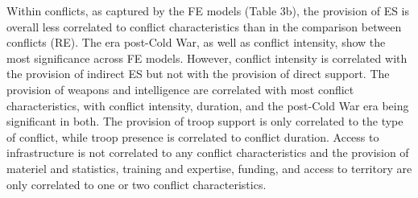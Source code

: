 \documentclass[
]{article}
\begin{document}
\begin{landscape}
\begin{table}[!h]
\centering
{}
\end{table}
\end{landscape}

Within conflicts, as captured by the FE models (Table 3b), the provision
of ES is overall less correlated to conflict characteristics than in the
comparison between conflicts (RE). The era post-Cold War, as well as
conflict intensity, show the most significance across FE models.
However, conflict intensity is correlated with the provision of indirect
ES but not with the provision of direct support. The provision of
weapons and intelligence are correlated with most conflict
characteristics, with conflict intensity, duration, and the post-Cold
War era being significant in both. The provision of troop support is
only correlated to the type of conflict, while troop presence is
correlated to conflict duration. Access to infrastructure is not
correlated to any conflict characteristics and the provision of materiel
and statistics, training and expertise, funding, and access to territory
are only correlated to one or two conflict characteristics.
\end{document}
